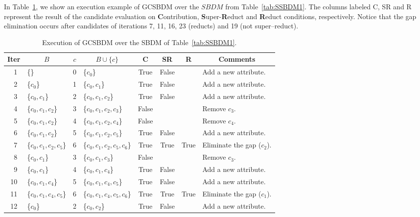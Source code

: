 \documentclass[authoryear,preprint,review,12pt]{elsarticle}
\begin{document}
	In Table~\ref{tab:sample_GCSBDM}, we show an execution example of GCSBDM over the $SBDM$ from Table~\ref{tab:SSBDM1}.
	The columns labeled C, SR and R represent the result of the candidate evaluation on
	\textbf{C}ontribution, \textbf{S}uper-\textbf{R}educt and \textbf{R}educt conditions, respectively. Notice that
	the gap elimination occurs after candidates of iterations 7, 11, 16, 23 (reducts) and 19 (not super--reduct).
	
	\begin{table}[!htb]
		\caption{Execution of GCSBDM over the SBDM of Table~\ref{tab:SSBDM1}.}\label{tab:sample_GCSBDM}
      	\centering
    		\begin{tabular}{|c|l|c|l|c|c|c|l|}
    		\hline
    		Iter & \multicolumn{1}{c|}{$B$} & $c$ & \multicolumn{1}{c|}{$B\cup \lbrace c\rbrace$} 
    		& C & SR & R & \multicolumn{1}{c|}{Comments}\\
    		\hline
    		~1 & \{\} 					& 0 & \{$c_0$\} 					& True & False &   & Add a new attribute.\\
    		~2 & \{$c_0$\} 				& 1 & \{$c_0,c_1$\}				& True & False &   & Add a new attribute.\\
    		~3 & \{$c_0,c_1$\} 			& 2 & \{$c_0,c_1,c_2$\}			& True & False &   & Add a new attribute.\\
    		~4 & \{$c_0,c_1,c_2$\} 		& 3 & \{$c_0,c_1,c_2,c_3$\}		& False &   &   & Remove $c_3$.\\
    		~5 & \{$c_0,c_1,c_2$\} 		& 4 & \{$c_0,c_1,c_2,c_4$\}		& False &   &   & Remove $c_4$.\\
    		~6 & \{$c_0,c_1,c_2$\}		& 5 & \{$c_0,c_1,c_2,c_5$\}		& True & False &   & Add a new attribute.\\
    		~7 & \{$c_0,c_1,c_2,c_5$\}	& 6 & \{$c_0,c_1,c_2,c_5,c_6$\} 	& True & True & True & Eliminate the gap ($c_2$).\\
    		~8 & \{$c_0,c_1$\} 			& 3 & \{$c_0,c_1,c_3$\}			& False &   &   & Remove $c_3$.\\
    		~9 & \{$c_0,c_1$\}			& 4 & \{$c_0,c_1,c_4$\}			& True & False &   & Add a new attribute.\\
    		10 & \{$c_0,c_1,c_4$\}		& 5 & \{$c_0,c_1,c_4,c_5$\}		& True & False &   & Add a new attribute.\\
    		11 & \{$c_0,c_1,c_4,c_5$\}	& 6 & \{$c_0,c_1,c_4,c_5,c_6$\} 	& True & True & True & Eliminate the gap ($c_1$).\\
    		12 & \{$c_0$\} 				& 2 & \{$c_0,c_2$\}				& True & False &   & Add a new attribute.\\

\end{tabular}
\end{table}
\end{document}

